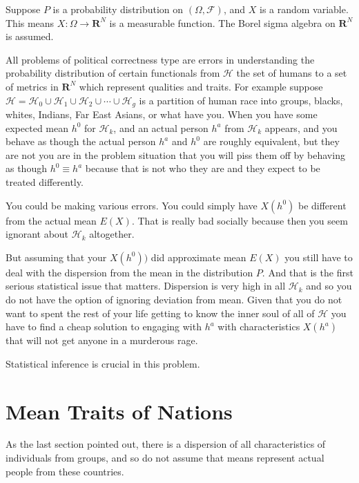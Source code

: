 \documentclass{amsart}
\begin{document}
Suppose $P$ is a probability distribution on $(\Omega, \mathcal{F})$, and $X$ is a random variable.  This means $X: \Omega \rightarrow \mathbf{R}^N$ is a measurable function.  The Borel sigma algebra on $\mathbf{R}^N$ is assumed.

All problems of political correctness type are errors in understanding the probability distribution of certain functionals from $\mathcal{H}$ the set of humans to a set of metrics in $\mathbf{R}^N$ which represent qualities and traits.  For example suppose $\mathcal{H} = \mathcal{H}_0 \cup \mathcal{H}_1 \cup \mathcal{H}_2 \cup \cdots \cup \mathcal{H}_g$ is a partition of human race into groups, blacks, whites, Indians, Far East Asians, or what have you.  When you have some expected mean $h^0$ for $\mathcal{H}_k$, and an actual person $h^a$ from $\mathcal{H}_k$ appears, and you behave as though the actual person $h^a$ and $h^0$ are roughly equivalent, but they are not you are in the problem situation that you will piss them off by behaving as though $h^0 \equiv h^a$ because that is not who they are and they expect to be treated differently.

You could be making various errors.  You could simply have $X(h^0)$ be different from the actual mean $E(X)$.  That is really bad socially because then you seem ignorant about $\mathcal{H}_k$ altogether.

But assuming that your $X(h^0))$ did approximate mean $E(X)$ you still have to deal with the dispersion from the mean in the distribution $P$.  And that is the first serious statistical issue that matters.  Dispersion is very high in all $\mathcal{H}_k$ and so you do not have the option of ignoring deviation from mean.  Given that you do not want to spent the rest of your life getting to know the inner soul of all of $\mathcal{H}$ you have to find a cheap solution to engaging with $h^a$ with characteristics $X(h^a)$ that will not get anyone in a murderous rage.  

Statistical inference is crucial in this problem.

\section{Mean Traits of Nations}

As the last section pointed out, there is a dispersion of all characteristics of individuals from groups, and so do not assume that means represent actual people from these countries.  

\end{document}
